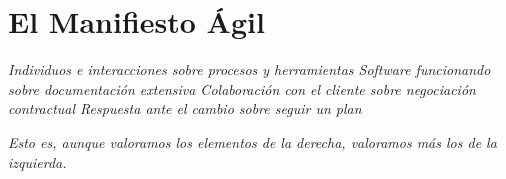 \documentclass[journal]{IEEEtran}
\begin{document}







%


\appendices
\section{El Manifiesto Ágil}\label{apendice:a}

\begin{center}
\emph{Individuos e interacciones sobre procesos y herramientas
Software funcionando sobre documentación extensiva
Colaboración con el cliente sobre negociación contractual
Respuesta ante el cambio sobre seguir un plan}
\end{center}

\emph{Esto es, aunque valoramos los elementos de la derecha,
valoramos más los de la izquierda.}
\end{document}
